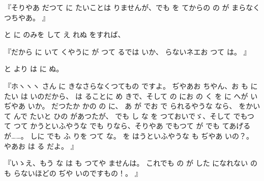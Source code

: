 『そりやあ
だつて
に
たいことは
りませんが、でも
を
てからの
の
が
まらなくつちやあ。
』

と
に
のみを
して
え
れぬ
をすれば、

『だから
に
いて
くやうに
が
つて
るでは
いか、
らないネエお
つて
は。
』

と
より
は
に
ぬ。

『ホヽヽヽ
さん
に
きなさらなくつてもの
ですよ。
ぢやあお
ちやん、お
も
に
たい
は
いのだから、
は
ることに
め
きで、そして
の
にお
の
く
を
に
へが
いぢやあ
いか。
だつたか
かの
の
に、
あ
が
でお
で
られるやうな
なら、
をかいて
んで
たいと
ひの
があつたが、
でも
し
な
を
つておいでゞ、そして
でもつて
つて
かうといふやうな
でも
りなら、そりやあ
でもつて
が
でも
てあげるが……。
しに
でも
ふ
りを
つて
な。
を
はうといふやうな
も
ぢやあ
いの？。
やあお
は
る
だよ。
』

『いゝえ、もう
な
は
も
つてや
ませんは。
これでも
の
が
した
になれない
の
も
らないほどの
ぢや
いのですもの！。
』

